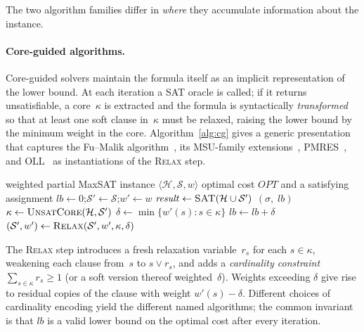 \documentclass[11pt,a4paper]{article}
\begin{document}
The two algorithm families differ in \emph{where} they accumulate information about the instance.

\paragraph{Core-guided algorithms.}
Core-guided solvers maintain the formula itself as an implicit representation of the lower bound. At each iteration a SAT oracle is called; if it returns unsatisfiable, a core~$\kappa$ is extracted and the formula is syntactically \emph{transformed} so that at least one soft clause in~$\kappa$ must be relaxed, raising the lower bound by the minimum weight in the core. Algorithm~\ref{alg:cg} gives a generic presentation that captures the Fu--Malik algorithm~\citep{fu2006solving}, its MSU-family extensions~\citep{marquessilva2008algorithms}, PMRES~\citep{narodytska2014maximum}, and OLL~\citep{morgado2014core} as instantiations of the \textsc{Relax} step.

\begin{algorithm}[t]
\caption{Generic Core-Guided MaxSAT}
\label{alg:cg}
\begin{algorithmic}[1]
\Require weighted partial MaxSAT instance $\langle \mathcal{H}, \mathcal{S}, w \rangle$
\Ensure optimal cost $\mathit{OPT}$ and a satisfying assignment
\State $\mathit{lb} \leftarrow 0$;\quad $\mathcal{S}' \leftarrow \mathcal{S}$;\quad $w' \leftarrow w$
\Loop
    \State $\mathit{result} \leftarrow \textsc{SAT}\!\left(\mathcal{H} \cup \mathcal{S}'\right)$
        \State \Return $(\sigma,\; \mathit{lb})$ 
    \EndIf
    \State $\kappa \leftarrow \textsc{UnsatCore}\!\left(\mathcal{H},\mathcal{S}'\right)$ 
    \State $\delta \leftarrow \min\{w'(s) : s \in \kappa\}$
    \State $\mathit{lb} \leftarrow \mathit{lb} + \delta$
    \State $(\mathcal{S}', w') \leftarrow \textsc{Relax}(\mathcal{S}', w', \kappa, \delta)$
\EndLoop
\end{algorithmic}
\end{algorithm}

The \textsc{Relax} step introduces a fresh relaxation variable~$r_s$ for each $s \in \kappa$, weakening each clause from~$s$ to $s \vee r_s$, and adds a \emph{cardinality constraint} $\sum_{s \in \kappa} r_s \geq 1$ (or a soft version thereof weighted~$\delta$). Weights exceeding $\delta$ give rise to residual copies of the clause with weight $w'(s) - \delta$. Different choices of cardinality encoding yield the different named algorithms; the common invariant is that $\mathit{lb}$ is a valid lower bound on the optimal cost after every iteration.
\end{document}
